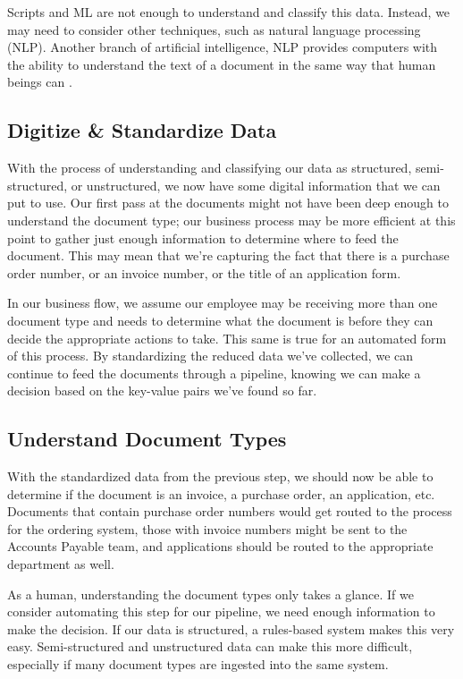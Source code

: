 \documentclass[conference, draftcls]{IEEEtran}
\begin{document}
Scripts and ML are not enough to understand and classify this data. Instead, we may need to consider other techniques, such as natural language processing (NLP). Another branch of artificial intelligence, NLP provides computers with the ability to understand the text of a document in the same way that human beings can \cite{ibm:nlp}.

\subsection{Digitize \& Standardize Data}
With the process of understanding and classifying our data as structured, semi-structured, or unstructured, we now have some digital information that we can put to use. Our first pass at the documents might not have been deep enough to understand the document type; our business process may be more efficient at this point to gather just enough information to determine where to feed the document. This may mean that we're capturing the fact that there is a purchase order number, or an invoice number, or the title of an application form. 

In our business flow, we assume our employee may be receiving more than one document type and needs to determine what the document is before they can decide the appropriate actions to take. This same is true for an automated form of this process. By standardizing the reduced data we've collected, we can continue to feed the documents through a pipeline, knowing we can make a decision based on the key-value pairs we've found so far.

\subsection{Understand Document Types}
With the standardized data from the previous step, we should now be able to determine if the document is an invoice, a purchase order, an application, etc. Documents that contain purchase order numbers would get routed to the process for the ordering system, those with invoice numbers might be sent to the Accounts Payable team, and applications should be routed to the appropriate department as well.

As a human, understanding the document types only takes a glance. If we consider automating this step for our pipeline, we need enough information to make the decision. If our data is structured, a rules-based system makes this very easy. Semi-structured and unstructured data can make this more difficult, especially if many document types are ingested into the same system. 
\end{document}

